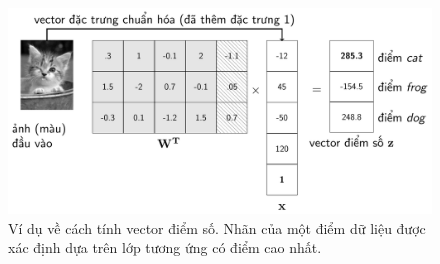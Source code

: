 




\begin{figure}[t]
\centering
\includegraphics[width = .8\textwidth]{Chapters/09_SupportVectorMachines/22_multiclasssvm/latex/scores.pdf}
\caption[]{Ví dụ về cách tính vector điểm số. Nhãn của một điểm dữ liệu được xác định dựa trên lớp tương ứng có điểm cao nhất.}
\label{fig:22_5}
\end{figure}



